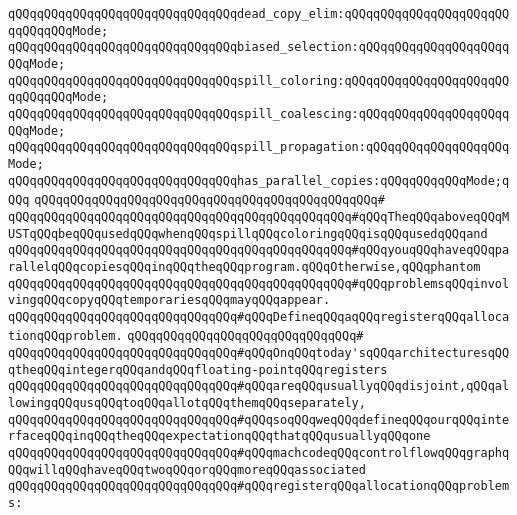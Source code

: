 \verb|qQQqqQQqqQQqqQQqqQQqqQQqqQQqqQQqdead_copy_elim:qQQqqQQqqQQqqQQqqQQqqQQqqQQqqQQqMode;|\newline
\verb|qQQqqQQqqQQqqQQqqQQqqQQqqQQqqQQqbiased_selection:qQQqqQQqqQQqqQQqqQQqqQQqMode;|\newline
\verb|qQQqqQQqqQQqqQQqqQQqqQQqqQQqqQQqspill_coloring:qQQqqQQqqQQqqQQqqQQqqQQqqQQqqQQqMode;|\newline
\verb|qQQqqQQqqQQqqQQqqQQqqQQqqQQqqQQqspill_coalescing:qQQqqQQqqQQqqQQqqQQqqQQqMode;|\newline
\verb|qQQqqQQqqQQqqQQqqQQqqQQqqQQqqQQqspill_propagation:qQQqqQQqqQQqqQQqqQQqMode;|\newline
\verb|qQQqqQQqqQQqqQQqqQQqqQQqqQQqqQQqhas_parallel_copies:qQQqqQQqqQQqMode;qQQq|\newline
\verb|qQQqqQQqqQQqqQQqqQQqqQQqqQQqqQQqqQQqqQQqqQQqqQQq#|\newline
\verb|qQQqqQQqqQQqqQQqqQQqqQQqqQQqqQQqqQQqqQQqqQQqqQQq#qQQqTheqQQqaboveqQQqMUSTqQQqbeqQQqusedqQQqwhenqQQqspillqQQqcoloringqQQqisqQQqusedqQQqand|\newline
\verb|qQQqqQQqqQQqqQQqqQQqqQQqqQQqqQQqqQQqqQQqqQQqqQQq#qQQqyouqQQqhaveqQQqparallelqQQqcopiesqQQqinqQQqtheqQQqprogram.qQQqOtherwise,qQQqphantom|\newline
\verb|qQQqqQQqqQQqqQQqqQQqqQQqqQQqqQQqqQQqqQQqqQQqqQQq#qQQqproblemsqQQqinvolvingqQQqcopyqQQqtemporariesqQQqmayqQQqappear.|\newline
\newline
\newline
\newline
\verb|qQQqqQQqqQQqqQQqqQQqqQQqqQQqqQQq#qQQqDefineqQQqaqQQqregisterqQQqallocationqQQqproblem.|\newline
\verb|qQQqqQQqqQQqqQQqqQQqqQQqqQQqqQQq#|\newline
\verb|qQQqqQQqqQQqqQQqqQQqqQQqqQQqqQQq#qQQqOnqQQqtoday'sqQQqarchitecturesqQQqtheqQQqintegerqQQqandqQQqfloating-pointqQQqregisters|\newline
\verb|qQQqqQQqqQQqqQQqqQQqqQQqqQQqqQQq#qQQqareqQQqusuallyqQQqdisjoint,qQQqallowingqQQqusqQQqtoqQQqallotqQQqthemqQQqseparately,|\newline
\verb|qQQqqQQqqQQqqQQqqQQqqQQqqQQqqQQq#qQQqsoqQQqweqQQqdefineqQQqourqQQqinterfaceqQQqinqQQqtheqQQqexpectationqQQqthatqQQqusuallyqQQqone|\newline
\verb|qQQqqQQqqQQqqQQqqQQqqQQqqQQqqQQq#qQQqmachcodeqQQqcontrolflowqQQqgraphqQQqwillqQQqhaveqQQqtwoqQQqorqQQqmoreqQQqassociated|\newline
\verb|qQQqqQQqqQQqqQQqqQQqqQQqqQQqqQQq#qQQqregisterqQQqallocationqQQqproblems:|\newline
